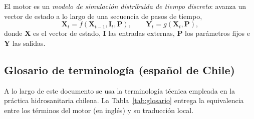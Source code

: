 \documentclass[11pt,a4paper]{article}
\begin{document}
El motor es un \emph{modelo de simulación distribuida de tiempo discreto}:
avanza un vector de estado a lo largo de una secuencia de pasos de tiempo,
\begin{equation}
  \boldsymbol{X}_{t} = f\!\left(\boldsymbol{X}_{t-1}, \boldsymbol{I}_{t}, \boldsymbol{P}\right),
  \qquad
  \boldsymbol{Y}_{t} = g\!\left(\boldsymbol{X}_{t}, \boldsymbol{P}\right),
\end{equation}
donde $\boldsymbol{X}$ es el vector de estado, $\boldsymbol{I}$ las entradas
externas, $\boldsymbol{P}$ los parámetros fijos e $\boldsymbol{Y}$ las salidas.

\subsection{Glosario de terminología (español de Chile)}

A lo largo de este documento se usa la terminología técnica empleada en la
práctica hidrosanitaria chilena. La Tabla~\ref{tab:glosario} entrega la
equivalencia entre los términos del motor (en inglés) y su traducción local.
\end{document}
